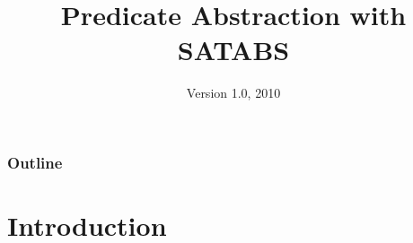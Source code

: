 

\def\TEMPOP#1{\mathrm{\bf #1}}
\def\X{\TEMPOP{X}}
\def\F{\TEMPOP{F}}
\def\E{\TEMPOP{E}}
\def\A{\TEMPOP{A}}
\def\G{\TEMPOP{G}}
\def\U{\mathrel{\TEMPOP{U}}}
\def\R{\mathrel{\TEMPOP{R}}}


\title{Predicate Abstraction with SATABS}

\date{Version 1.0, 2010}





\frame[plain]{\titlepage}


\begin{frame}
\frametitle{Outline}
\setcounter{tocdepth}{1}
\tableofcontents
\setcounter{tocdepth}{2}
\end{frame}


\section{Introduction}



